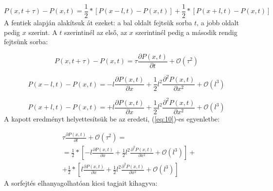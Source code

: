 \begin{equation} \label{eq:10}
    P \left( x, t + \tau \right) - P \left( x, t \right)
    =
    \frac{1}{2} * \left[ P \left( x - l, t \right) - P \left( x, t \right) \right] + \frac{1}{2} * \left[ P \left( x + l, t \right) - P \left( x, t \right) \right]
\end{equation}
A fentiek alapján alakítsuk át ezeket: a bal oldalt fejtsük sorba $t$, a jobb oldalt pedig $x$ szerint. A $t$ szerintinél az első, az $x$ szerintinél pedig a második rendig fejtsünk sorba:

\begin{equation} \label{eq:11}
    P \left( x, t + \tau \right) - P \left( x, t \right)
    =
    \tau \frac{\partial P \left( x, t \right)}{\partial t} + \mathcal{O} \left( \tau^{2} \right)
\end{equation}

\begin{equation} \label{eq:12}
    P \left( x - l, t \right) - P \left( x, t \right)
    =
    -l \frac{\partial P \left( x, t \right)}{\partial x} + \frac{1}{2} l^{2} \frac{\partial^{2} P \left( x, t \right)}{\partial x^{2}} + \mathcal{O} \left( l^{3} \right)
\end{equation}

\begin{equation} \label{eq:13}
    P \left( x + l, t \right) - P \left( x, t \right)
    =
    +l \frac{\partial P \left( x, t \right)}{\partial x} + \frac{1}{2} l^{2} \frac{\partial^{2} P \left( x, t \right)}{\partial x^{2}} + \mathcal{O} \left( l^{3} \right)
\end{equation}
A kapott eredményt helyettesítsük be az eredeti, (\ref{eq:10})-es egyenletbe:

\begin{align} \label{eq:14}
    &\tau \frac{\partial P \left( x, t \right)}{\partial t} + \mathcal{O} \left( \tau^{2} \right) = \nonumber \\
    &=
    \frac{1}{2} * \left[ -l \frac{\partial P \left( x, t \right)}{\partial x} + \frac{1}{2} l^{2} \frac{\partial^{2} P \left( x, t \right)}{\partial x^{2}} + \mathcal{O} \left( l^{3} \right) \right] + \nonumber \\
    &+
    \frac{1}{2} * \left[ l \frac{\partial P \left( x, t \right)}{\partial x} + \frac{1}{2} l^{2} \frac{\partial^{2} P \left( x, t \right)}{\partial x^{2}} + \mathcal{O} \left( l^{3} \right) \right]
\end{align}
A sorfejtés elhanyagolhatóan kicsi tagjait kihagyva:

